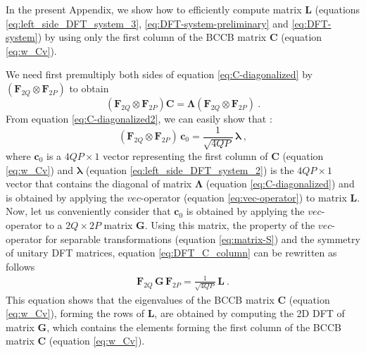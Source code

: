 

In the present Appendix, we show how to efficiently compute matrix $\mathbf{L}$
(equations \ref{eq:left_side_DFT_system_3}, \ref{eq:DFT-system-preliminary} 
and \ref{eq:DFT-system}) by using only the first column of the BCCB matrix
$\mathbf{C}$ (equation \ref{eq:w_Cv}).

We need first premultiply both sides of equation \ref{eq:C-diagonalized}
by $\left(\mathbf{F}_{2Q} \otimes \mathbf{F}_{2P} \right)$ to obtain
\begin{equation}
\left(\mathbf{F}_{2Q} \otimes \mathbf{F}_{2P} \right) \mathbf{C} = 
\boldsymbol{\Lambda}
\left(\mathbf{F}_{2Q} \otimes \mathbf{F}_{2P} \right) \: .
\label{eq:C-diagonalized2}
\end{equation}
From equation \ref{eq:C-diagonalized2}, we can easily show that 
\citep[][ p. 77]{chan-jin2007}:
\begin{equation}
	\left(\mathbf{F}_{2Q} \otimes \mathbf{F}_{2P} \right) \, 
	\mathbf{c}_{0} = \frac{1}{\sqrt{4QP}} \, \boldsymbol{\lambda} \: ,
	\label{eq:DFT_C_column}
\end{equation}
where $\mathbf{c}_{0}$ is a $4QP \times 1$ vector representing the first column of 
$\mathbf{C}$ (equation \ref{eq:w_Cv}) and 
$\boldsymbol{\lambda}$ (equation \ref{eq:left_side_DFT_system_2}) is the $4QP \times 1$ 
vector that contains the diagonal of matrix $\boldsymbol{\Lambda}$ (equation \ref{eq:C-diagonalized}) 
and is obtained by applying the $vec$-operator (equation \ref{eq:vec-operator}) to matrix $\mathbf{L}$.
Now, let us conveniently consider that $\mathbf{c}_{0}$ is obtained by applying the $vec$-operator 
to a $2Q \times 2P$ matrix $\mathbf{G}$.
Using this matrix, the property of the $vec$-operator for separable transformations 
(equation \ref{eq:matrix-S}) and the symmetry of unitary DFT matrices, equation \ref{eq:DFT_C_column} 
can be rewritten as follows
\begin{eqnarray}
	\mathbf{F}_{2Q} \, \mathbf{G} \, \mathbf{F}_{2P} = 
	\frac{1}{\sqrt{4QP}} \, \mathbf{L} \: .
	\label{eq:DFT_G}
\end{eqnarray}
This equation shows that the eigenvalues of the BCCB matrix $\mathbf{C}$ 
(equation \ref{eq:w_Cv}), forming the rows of $\mathbf{L}$,
are obtained by computing the 2D DFT of matrix $\mathbf{G}$,
which contains the elements forming the first column of the BCCB matrix 
$\mathbf{C}$ (equation \ref{eq:w_Cv}).